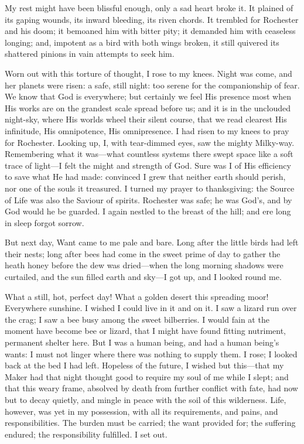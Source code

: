 My rest might have been blissful enough, only a sad heart broke it. It
plained of its gaping wounds, its inward bleeding, its riven chords. It
trembled for \Mr{} Rochester and his doom; it bemoaned him with bitter
pity; it demanded him with ceaseless longing; and, impotent as a bird
with both wings broken, it still quivered its shattered pinions in vain
attempts to seek him.

Worn out with this torture of thought, I rose to my knees. Night was
come, and her planets were risen: a safe, still night: too serene for
the companionship of fear. We know that God is everywhere; but
certainly we feel His presence most when His works are on the grandest
scale spread before us; and it is in the unclouded night-sky, where His
worlds wheel their silent course, that we read clearest His infinitude,
His omnipotence, His omnipresence. I had risen to my knees to pray for
\Mr{} Rochester. Looking up, I, with tear-dimmed eyes, saw the mighty
Milky-way. Remembering what it was---what countless systems there swept
space like a soft trace of light---I felt the might and strength of
God. Sure was I of His efficiency to save what He had made: convinced I
grew that neither earth should perish, nor one of the souls it
treasured. I turned my prayer to thanksgiving: the Source of Life was
also the Saviour of spirits. \Mr{} Rochester was safe; he was God's, and
by God would he be guarded. I again nestled to the breast of the hill;
and ere long in sleep forgot sorrow.

But next day, Want came to me pale and bare. Long after the little
birds had left their nests; long after bees had come in the sweet prime
of day to gather the heath honey before the dew was dried---when the
long morning shadows were curtailed, and the sun filled earth and
sky---I got up, and I looked round me.

What a still, hot, perfect day! What a golden desert this spreading
moor! Everywhere sunshine. I wished I could live in it and on it. I
saw a lizard run over the crag; I saw a bee busy among the sweet
bilberries. I would fain at the moment have become bee or lizard, that
I might have found fitting nutriment, permanent shelter here. But I was
a human being, and had a human being's wants: I must not linger where
there was nothing to supply them. I rose; I looked back at the bed I
had left. Hopeless of the future, I wished but this---that my Maker had
that night thought good to require my soul of me while I slept; and that
this weary frame, absolved by death from further conflict with fate, had
now but to decay quietly, and mingle in peace with the soil of this
wilderness. Life, however, was yet in my possession, with all its
requirements, and pains, and responsibilities. The burden must be
carried; the want provided for; the suffering endured; the
responsibility fulfilled. I set out.

